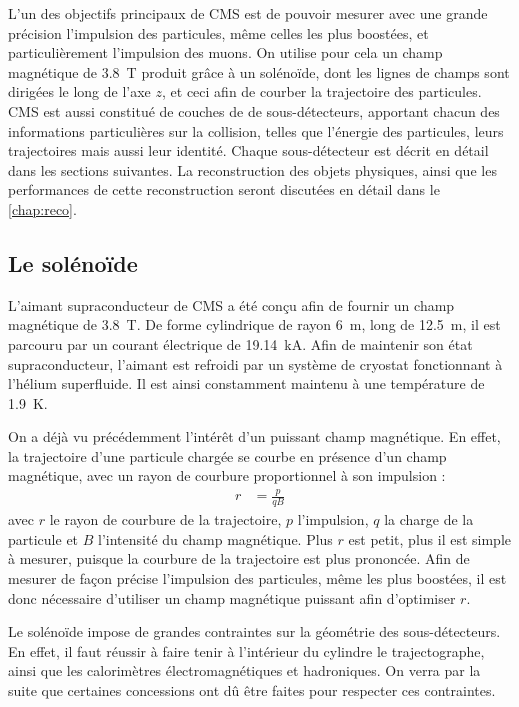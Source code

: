 
L'un des objectifs principaux de CMS est de pouvoir mesurer avec une grande précision l'impulsion des particules, même celles les plus boostées, et particulièrement l'impulsion des muons. On utilise pour cela un champ magnétique de \SI{3.8}{\tesla} produit grâce à un solénoïde, dont les lignes de champs sont dirigées le long de l'axe $z$, et ceci afin de courber la trajectoire des particules. CMS est aussi constitué de couches de de sous-détecteurs, apportant chacun des informations particulières sur la collision, telles que l'énergie des particules, leurs trajectoires mais aussi leur identité. Chaque sous-détecteur est décrit en détail dans les sections suivantes. La reconstruction des objets physiques, ainsi que les performances de cette reconstruction seront discutées en détail dans le \cref{chap:reco}.

\subsection{Le solénoïde}

L'aimant supraconducteur de CMS a été conçu afin de fournir un champ magnétique de \SI{3.8}{\tesla}. De forme cylindrique de rayon \SI{6}{\m}, long de \SI{12.5}{\meter}, il est parcouru par un courant électrique de \SI{19.14}{\kilo\ampere}. Afin de maintenir son état supraconducteur, l'aimant est refroidi par un système de cryostat fonctionnant à l'hélium superfluide. Il est ainsi constamment maintenu à une température de \SI{1.9}{\kelvin}.

On a déjà vu précédemment l'intérêt d'un puissant champ magnétique. En effet, la trajectoire d'une particule chargée se courbe en présence d'un champ magnétique, avec un rayon de courbure proportionnel à son impulsion :
\begin{align*}
  r &= \frac{p}{qB}
\end{align*}
avec $r$ le rayon de courbure de la trajectoire, $p$ l'impulsion, $q$ la charge de la particule et $B$ l'intensité du champ magnétique. Plus $r$ est petit, plus il est simple à mesurer, puisque la courbure de la trajectoire est plus prononcée. Afin de mesurer de façon précise l'impulsion des particules, même les plus boostées, il est donc nécessaire d'utiliser un champ magnétique puissant afin d'optimiser $r$.

\medskip

Le solénoïde impose de grandes contraintes sur la géométrie des sous-détecteurs. En effet, il faut réussir à faire tenir à l'intérieur du cylindre le trajectographe, ainsi que les calorimètres électromagnétiques et hadroniques. On verra par la suite que certaines concessions ont dû être faites pour respecter ces contraintes.

